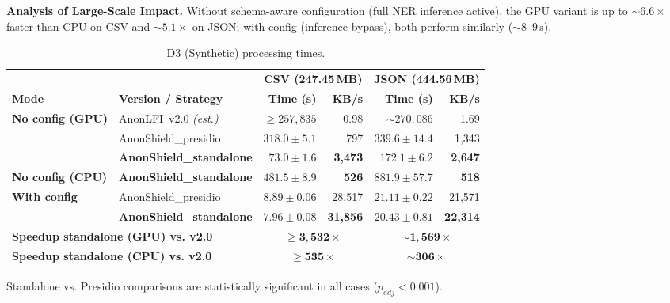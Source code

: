 \documentclass[12pt]{article}
\begin{document}
\textbf{Analysis of Large-Scale Impact.}
Without schema-aware configuration (full NER inference active), the GPU variant is up to ${\sim}6.6\times$ faster than CPU on CSV and ${\sim}5.1\times$ on JSON; with config (inference bypass), both perform similarly (${\sim}8\text{--}9$\,s).

\begin{table}[!htp]
\centering
\caption{D3 (Synthetic) processing times.}
\label{tab:large_scale_d3_merged}
\scriptsize
\begin{tabular}{llrrrr}
\toprule
 & & \multicolumn{2}{c}{\textbf{CSV (247.45\,MB)}} & \multicolumn{2}{c}{\textbf{JSON (444.56\,MB)}} \\
\cmidrule(lr){3-4}\cmidrule(lr){5-6}
\textbf{Mode} & \textbf{Version / Strategy} & \textbf{Time (s)} & \textbf{KB/s} & \textbf{Time (s)} & \textbf{KB/s} \\
\midrule
\multirow{3}{*}{\textbf{No config (GPU)}}
 & AnonLFI~v2.0 \emph{(est.)} & ${\geq}257{,}835$ & 0.98 & ${\sim}270{,}086$ & 1.69 \\
 & AnonShield\_presidio & $318.0 \pm 5.1$ & 797 & $339.6 \pm 14.4$ & 1{,}343 \\
 & \textbf{AnonShield\_standalone} & $\mathbf{73.0 \pm 1.6}$ & \textbf{3{,}473} & $\mathbf{172.1 \pm 6.2}$ & \textbf{2{,}647} \\
\midrule
\textbf{No config (CPU)} & \textbf{AnonShield\_standalone} & $\mathbf{481.5 \pm 8.9}$ & \textbf{526} & $\mathbf{881.9 \pm 57.7}$ & \textbf{518} \\
\midrule
\multirow{2}{*}{\textbf{With config}}
 & AnonShield\_presidio & $8.89 \pm 0.06$ & 28{,}517 & $21.11 \pm 0.22$ & 21{,}571 \\
 & \textbf{AnonShield\_standalone} & $\mathbf{7.96 \pm 0.08}$ & \textbf{31{,}856} & $\mathbf{20.43 \pm 0.81}$ & \textbf{22{,}314} \\
\midrule
\multicolumn{2}{l}{\textbf{Speedup standalone (GPU) vs. v2.0}} & \multicolumn{2}{c}{$\mathbf{{\geq}3{,}532\times}$} & \multicolumn{2}{c}{$\mathbf{{\sim}1{,}569\times}$} \\
\multicolumn{2}{l}{\textbf{Speedup standalone (CPU) vs. v2.0}} & \multicolumn{2}{c}{$\mathbf{{\geq}535\times}$} & \multicolumn{2}{c}{$\mathbf{{\sim}306\times}$} \\
\bottomrule
\end{tabular}

{\scriptsize Standalone vs. Presidio comparisons are statistically significant in all cases ($p_{adj}<0.001$).}
\end{table}
\end{document}

